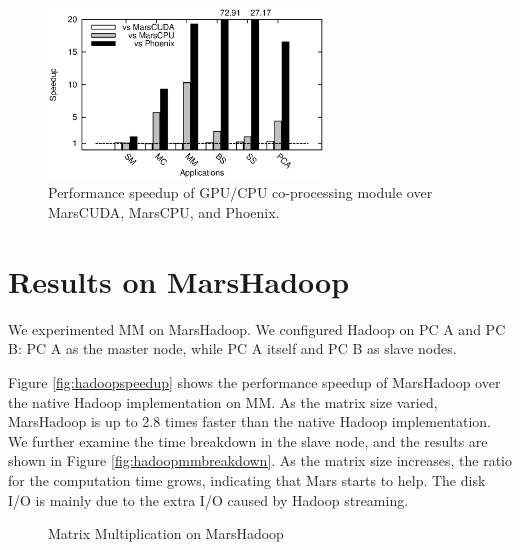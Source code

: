 \begin{figure}[h]
 \centering
 \includegraphics[width=0.65\textwidth]{figure/coprocess.eps}
 \caption{Performance speedup of GPU/CPU co-processing module over MarsCUDA, MarsCPU, and Phoenix.}\label{fig:coprocess}
\end{figure}


\section{Results on MarsHadoop}

We experimented MM on MarsHadoop. We configured Hadoop on
PC A and PC B: PC A as the master node, while PC A itself and PC B
as slave nodes.


Figure \ref{fig:hadoopspeedup} shows the performance speedup of
MarsHadoop over the native Hadoop implementation on MM. As the
matrix size varied, MarsHadoop is up to 2.8 times faster than the
native Hadoop implementation. We further examine the time breakdown
in the slave node, and the results are shown in Figure
\ref{fig:hadoopmmbreakdown}. As the matrix size increases, the ratio
for the computation time grows, indicating that Mars starts to help.
The disk I/O is mainly due to the extra I/O caused by Hadoop
streaming.

\begin{figure}[h]
\centerline{
\hfill
{} } \caption{Matrix Multiplication on MarsHadoop}
\end{figure}

